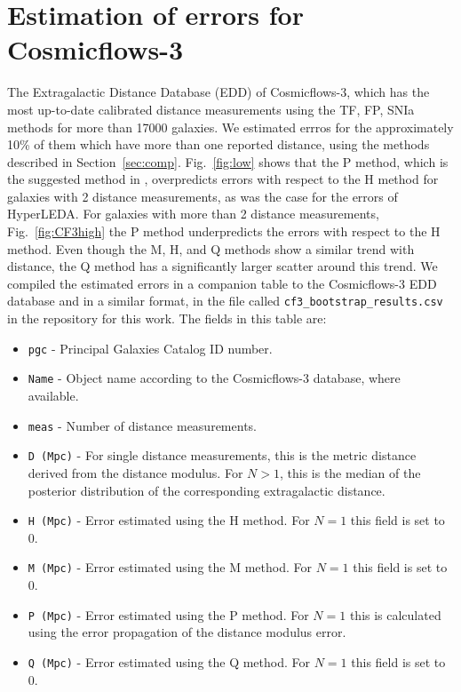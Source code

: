 \documentclass[a4paper,fleqn,usenatbib]{mnras}
\begin{document}
\section{Estimation of errors for Cosmicflows-3}
The Extragalactic Distance Database (EDD) of Cosmicflows-3, which has the most up-to-date calibrated distance measurements using the TF, FP, SNIa methods for more than 17000 galaxies. We estimated errros for the approximately 10\% of them which have more than one reported distance, using the methods described in Section~\ref{sec:comp}. Fig.~\ref{fig:low} shows that the P method, which is the suggested method in \citet{cosmicflows}, overpredicts errors with respect to the H method for galaxies with 2 distance measurements, as was the case for the errors of HyperLEDA. For galaxies with more than 2 distance measurements, Fig.~\ref{fig:CF3high} the P method underpredicts the errors with respect to the H method. Even though the M, H, and Q methods show a similar trend with distance, the Q method has a significantly larger scatter around this trend. We compiled the estimated errors in a companion table to the Cosmicflows-3 EDD database and in a similar format, in the file called \texttt{cf3\_bootstrap\_results.csv} in the repository for this work. The fields in this table are:
\begin{itemize}
\item \texttt{pgc} - Principal Galaxies Catalog ID number.
\item \texttt{Name} - Object name according to the Cosmicflows-3 database, where available.
\item \texttt{meas} - Number of distance measurements.
\item \texttt{D (Mpc)} - For single distance measurements, this is the metric distance derived from the distance modulus. For $N>1$, this is the median of the posterior distribution of the corresponding extragalactic distance.
\item \texttt{H (Mpc)} - Error estimated using the H method. For $N=1$ this field is set to 0.
\item \texttt{M (Mpc)} - Error estimated using the M method. For $N=1$ this field is set to 0.
\item \texttt{P (Mpc)} - Error estimated using the P method. For $N=1$ this is calculated using the error propagation of the distance modulus error.
\item \texttt{Q (Mpc)} - Error estimated using the Q method. For $N=1$ this field is set to 0.
\end{itemize}
\end{document}
